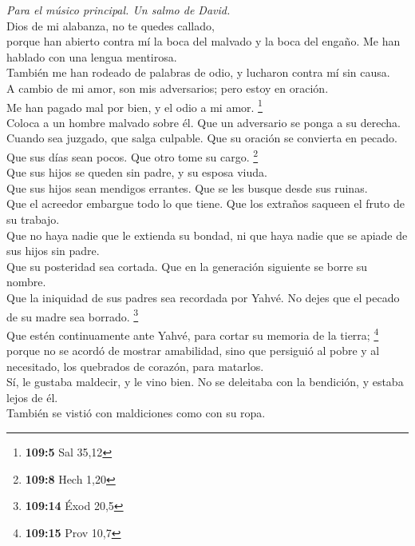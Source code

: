 \emph{Para el músico principal. Un salmo de David.}\\
 Dios de mi alabanza, no te quedes callado,\\
 porque han abierto contra mí la boca del malvado y la
boca del engaño. Me han hablado con una lengua mentirosa.\\
 También me han rodeado de palabras de odio, y lucharon
contra mí sin causa.\\
 A cambio de mi amor, son mis adversarios; pero estoy en
oración.\\
 Me han pagado mal por bien, y el odio a mi amor.
\footnote{\textbf{109:5} Sal 35,12}\\
 Coloca a un hombre malvado sobre él. Que un adversario se
ponga a su derecha.\\
 Cuando sea juzgado, que salga culpable. Que su oración se
convierta en pecado.\\
 Que sus días sean pocos. Que otro tome su cargo.
\footnote{\textbf{109:8} Hech 1,20}\\
 Que sus hijos se queden sin padre, y su esposa viuda.\\
 Que sus hijos sean mendigos errantes. Que se les busque
desde sus ruinas.\\
 Que el acreedor embargue todo lo que tiene. Que los
extraños saqueen el fruto de su trabajo.\\
 Que no haya nadie que le extienda su bondad, ni que haya
nadie que se apiade de sus hijos sin padre.\\
 Que su posteridad sea cortada. Que en la generación
siguiente se borre su nombre.\\
 Que la iniquidad de sus padres sea recordada por Yahvé.
No dejes que el pecado de su madre sea borrado. \footnote{\textbf{109:14}
  Éxod 20,5}\\
 Que estén continuamente ante Yahvé, para cortar su
memoria de la tierra; \footnote{\textbf{109:15} Prov 10,7}\\
 porque no se acordó de mostrar amabilidad, sino que
persiguió al pobre y al necesitado, los quebrados de corazón, para
matarlos.\\
 Sí, le gustaba maldecir, y le vino bien. No se deleitaba
con la bendición, y estaba lejos de él.\\
 También se vistió con maldiciones como con su ropa.
